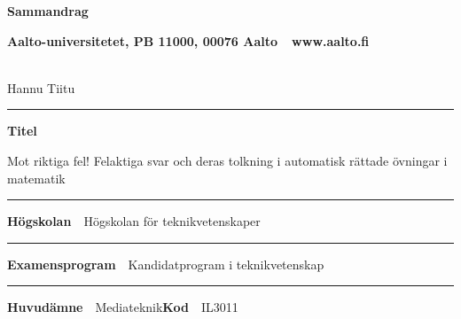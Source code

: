 
\newpage
{}
{}


\begin{spacing}{.88}

{\parindent0pt %

{\fontsize{13.9pt}{13.9pt}\selectfont
\vspace{-8.9mm}\hfill{\bfseries\sffamily\lsstyle Sammandrag}}

{\fontsize{9.48pt}{9.48pt}\selectfont
\vspace{.9mm}\hfill{\bfseries\sffamily\lsstyle Aalto-universitetet, PB 11000, 00076 Aalto~~\textcolor{aaltoGray}{www.aalto.fi}}}

\\
{\small Hannu Tiitu}

\vspace{-2.4mm}\rule{\textwidth}{.75pt}

{\fontsize{10.5pt}{10.5pt}\bfseries\sffamily\lsstyle Titel}\\
\parbox[t]{\textwidth}{\raggedright\small Mot riktiga fel! Felaktiga svar och deras tolkning i automatisk rättade övningar i matematik}

\vspace{.5mm}\rule{\textwidth}{.75pt}

{\fontsize{10.5pt}{10.5pt}\bfseries\sffamily\lsstyle Högskolan}~~{\small Högskolan för teknikvetenskaper}

\vspace{-2.4mm}\rule{\textwidth}{.75pt}

{\fontsize{10.5pt}{10.5pt}\bfseries\sffamily\lsstyle Examensprogram}~~{\small Kandidatprogram i teknikvetenskap}

\vspace{-2.4mm}\rule{\textwidth}{.75pt}

{\fontsize{10.5pt}{10.5pt}\bfseries\sffamily\lsstyle Huvudämne}~~{\small Mediateknik}\hfill{\fontsize{10.5pt}{10.5pt}\bfseries\sffamily\lsstyle Kod}~~{\small IL3011}

}
\end{spacing}
